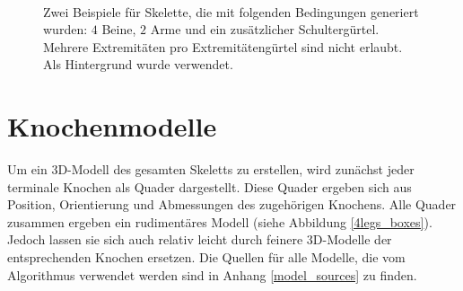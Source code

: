 \begin{figure}
 ~
 
 \caption{Zwei Beispiele für Skelette, die mit folgenden Bedingungen generiert wurden: $4$ Beine, $2$ Arme und ein zusätzlicher Schultergürtel. Mehrere Extremitäten pro Extremitätengürtel sind nicht erlaubt. Als Hintergrund wurde \cite{background} verwendet.}
 \label{zentauren}
\end{figure}

\section{Knochenmodelle}
\label{bone_models}

Um ein 3D-Modell des gesamten Skeletts zu erstellen, wird zunächst jeder terminale Knochen als Quader dargestellt. Diese Quader ergeben sich aus Position, Orientierung und Abmessungen des zugehörigen Knochens. Alle Quader zusammen ergeben ein rudimentäres Modell (siehe Abbildung \ref{4legs_boxes}). Jedoch lassen sie sich auch relativ leicht durch feinere 3D-Modelle der entsprechenden Knochen ersetzen. Die Quellen für alle Modelle, die vom Algorithmus verwendet werden sind in Anhang \ref{model_sources} zu finden.

